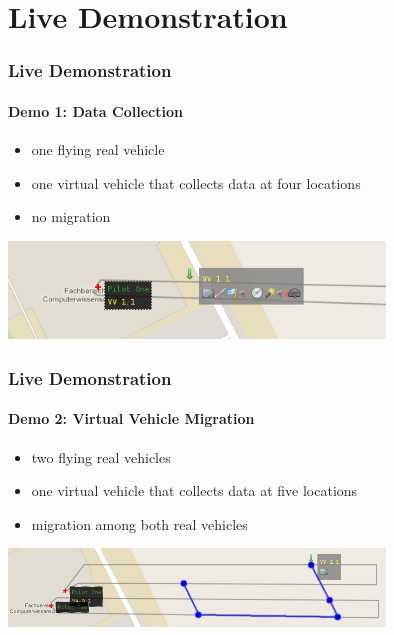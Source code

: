 \documentclass{beamer}
\begin{document}
\section{Live Demonstration}

\begin{frame}\frametitle{Live Demonstration}\framesubtitle{Demo 1: Data Collection}
	\begin{itemize}
		\item one flying real vehicle
		\item one virtual vehicle that collects data at four locations
		\item no migration
	\end{itemize}
	\vspace{0.5cm}
	\begin{center}
		{\includegraphics[width=10cm]{demo1.png}}
	\end{center}
\end{frame}


\begin{frame}\frametitle{Live Demonstration}\framesubtitle{Demo 2: Virtual Vehicle Migration}
	\begin{itemize}
		\item two flying real vehicles
		\item one virtual vehicle that collects data at five locations
		\item migration among both real vehicles
	\end{itemize}
	\vspace{0.5cm}
	\begin{center}
		{\includegraphics[width=10cm]{demo2.png}}
	\end{center}
\end{frame}
\end{document}
